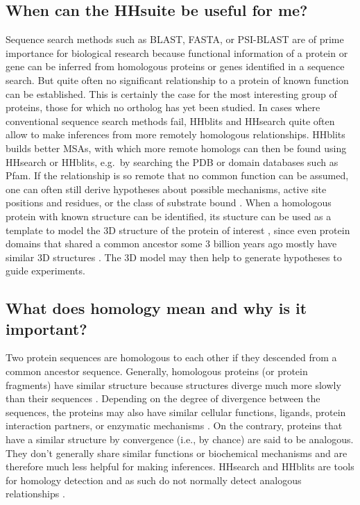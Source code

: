 \documentclass[11pt,a4paper]{article}
\begin{document}
\subsection{When can the HHsuite be useful for me?}
Sequence search methods such as BLAST, FASTA, or PSI-BLAST are of prime importance for biological research because functional information of a protein or gene can be inferred from homologous proteins or genes identified in a sequence search. But quite often no significant relationship to a protein of known function can be established. This is certainly the case for the most interesting group of proteins, those for which no ortholog has yet been studied. In cases where conventional sequence search methods fail, HHblits and HHsearch quite often allow to make inferences from more remotely homologous relationships. HHblits builds better MSAs, with which more remote homologs can then be found using HHsearch or HHblits, e.g.\ by searching the PDB or domain databases such as Pfam. If the relationship is so remote that no common function can be assumed, one can often still derive hypotheses about possible mechanisms, active site positions and residues, or the class of substrate bound \cite{Todd:2001, Pawlowski:2000}. When a homologous protein with known structure can be identified, its stucture can be used as a template to model the 3D structure of the protein of interest \cite{Rychlewski:1998}, since even protein domains that shared a common ancestor some 3 billion years ago mostly have similar 3D structures \cite{Kinch:2002,Soding:2006a,Alva:2010}. The 3D model may then help to generate hypotheses to guide experiments. 

\subsection{What does homology mean and why is it important?}
Two protein sequences are homologous to each other if they descended from a common ancestor sequence. Generally, homologous proteins (or protein fragments) have similar structure because structures diverge much more slowly than their sequences \cite{Chothia:1986}. Depending on the degree of divergence between the sequences, the proteins may also have similar cellular functions, ligands, protein interaction partners, or enzymatic mechanisms \cite{Todd:2001}. On the contrary, proteins that have a similar structure by convergence (i.e., by chance) are said to be analogous. They don't generally share similar functions or biochemical mechanisms and are therefore much less helpful for making inferences. HHsearch and HHblits are tools for homology detection and as such do not normally detect analogous relationships \cite{Alva:2010,Remmert:2010}.
\end{document}
